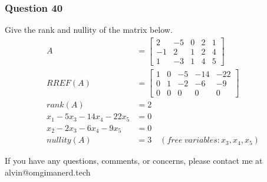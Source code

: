 \documentclass{math}
\begin{document}
\subsubsection*{Question 40}
Give the rank and nullity of the matrix below.
\begin{align*}
  A &= \begin{bmatrix}
    2 & -5 & 0 & 2 & 1 \\
    -1 & 2 & 1 & 2 & 4 \\
    1 & -3 & 1 & 4 & 5
  \end{bmatrix} \\
  RREF(A) &= \begin{bmatrix}
    1 & 0 & -5 & -14 & -22 \\
    0 & 1 & -2 & -6 & -9 \\
    0 & 0 & 0 & 0 & 0
  \end{bmatrix} \\
  rank(A) &= 2 \\
  x_1-5x_3-14x_4-22x_5 &= 0 \\
  x_2-2x_3-6x_4-9x_5 &= 0 \\
  nullity(A) &= 3 \quad (free~variables: x_3,x_4,x_5)
\end{align*}

\begin{center}
  If you have any questions, comments, or concerns, please contact me at
  alvin@omgimanerd.tech
\end{center}
\end{document}
